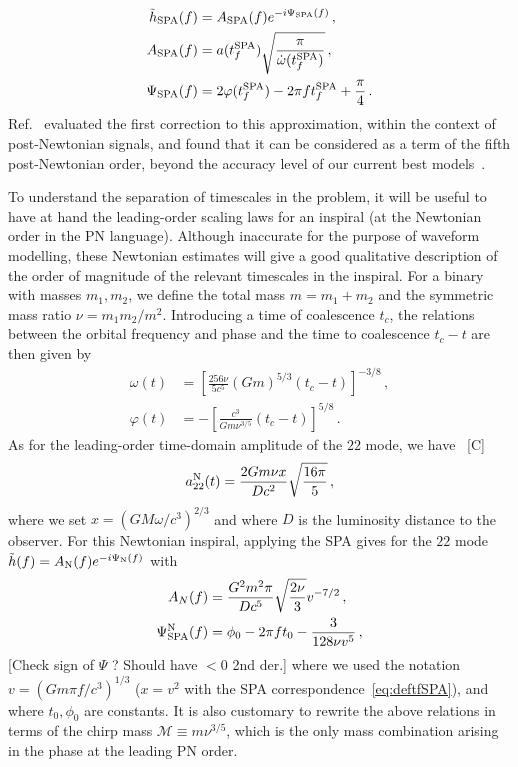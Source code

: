 \documentclass[aps,showpacs,twocolumn,
prd,superscriptaddress,nofootinbib]{revtex4-1}
\newcommand{\be}{\begin{equation}}
\newcommand{\ee}{\end{equation}}
\newcommand\calM{{\mathcal{M}}}
\newcommand{\SM}[1]{{\color{Red} #1}}
\begin{document}
\begin{subequations}
\begin{align}
	\tilde{h}_{\rm SPA}(f) &= A_{\rm SPA}(f) e^{-i\Psi_{\rm SPA}(f)} \,, \\
	A_{\rm SPA}(f) &= a(t_{f}^{\rm SPA}) \sqrt{\frac{\pi}{\dot{\omega}(t_{f}^{\rm SPA})}} \,, \\
	\Psi_{\rm SPA}(f) &= 2\varphi(t_{f}^{\rm SPA}) - 2\pi f t_{f}^{\rm SPA} + \frac{\pi}{4} \,.
\end{align}
\end{subequations}
Ref.~\cite{Droz+99} evaluated the first correction to this approximation, within the context of post-Newtonian signals, and found that it can be considered as a term of the fifth post-Newtonian order, beyond the accuracy level of our current best models~\cite{BlanchetLiving}.

To understand the separation of timescales in the problem, it will be useful to have at hand the leading-order scaling laws for an inspiral (at the Newtonian order in the PN language). Although inaccurate for the purpose of waveform modelling, these Newtonian estimates will give a good qualitative description of the order of magnitude of the relevant timescales in the inspiral. For a binary with masses $m_{1}, m_{2}$, we define the total mass $m=m_{1}+m_{2}$ and the symmetric mass ratio $\nu = m_{1}m_{2}/m^{2}$. Introducing a time of coalescence $t_{c}$, the relations between the orbital frequency and phase and the time to coalescence $t_{c} - t$ are then given by
\begin{subequations}
\begin{align}
	\omega(t) &= \left[ \frac{256\nu}{5c^{5}} (Gm)^{5/3} (t_{c}-t) \right]^{-3/8} \,, \\
	\varphi(t) &= -\left[ \frac{c^{3}}{G m \nu^{3/5}} (t_{c}-t) \right]^{5/8} \,.
\end{align}
\end{subequations}
As for the leading-order time-domain amplitude of the $22$ mode, we have~\cite{} \SM{[C]}
\be\label{eq:a22N}
	a_{22}^{\rm N} (t) = \frac{2 G m \nu x}{D c^{2}} \sqrt{\frac{16 \pi}{5}} \,,
\ee
where we set $x = (G M\omega/c^{3})^{2/3}$ and where $D$ is the luminosity distance to the observer. For this Newtonian inspiral, applying the SPA gives for the $22$ mode $\tilde{h}(f) = A_{\rm N}(f)e^{-i\Psi_{\rm N}(f)}$ with
\begin{subequations}
\begin{align}
	A_{N}(f) &= \frac{G^{2}m^{2} \pi}{Dc^{5}} \sqrt{\frac{2\nu}{3}} v^{-7/2}\,,\\
	\Psi_{\rm SPA}^{\rm N}(f) &= \phi_{0} - 2\pi f t_{0} - \frac{3}{128\nu v^{5}} \,, 
\end{align}
\end{subequations}
\SM{[Check sign of $\Psi$ ? Should have $<0$ 2nd der.] }
where we used the notation $v=(G m \pi f/c^{3})^{1/3}$ ($x=v^{2}$ with the SPA correspondence~\eqref{eq:deftfSPA}), and where $t_{0}, \phi_{0}$ are constants. It is also customary to rewrite the above relations in terms of the chirp mass $\calM \equiv m\nu^{3/5}$, which is the only mass combination arising in the phase at the leading PN order.
\end{document}
